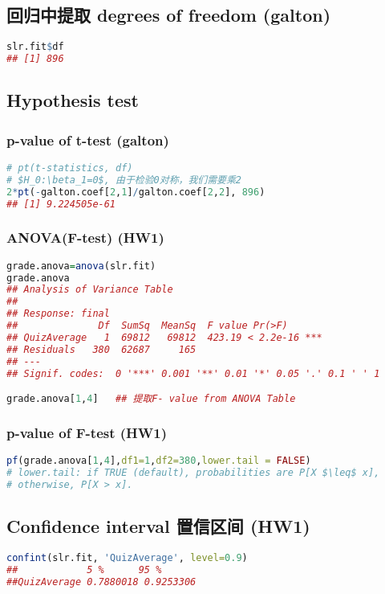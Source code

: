 \documentclass[11pt,a4paper]{article}
\begin{document}
\subsection{回归中提取 degrees of freedom (galton)}
\begin{lstlisting}[language=R]
slr.fit$df
## [1] 896
\end{lstlisting}












\subsection{Hypothesis test}
\subsubsection{p-value of t-test (galton)}
\begin{lstlisting}[language=R]
# pt(t-statistics, df)
# $H_0:\beta_1=0$, 由于检验0对称，我们需要乘2
2*pt(-galton.coef[2,1]/galton.coef[2,2], 896)
## [1] 9.224505e-61
\end{lstlisting}


\subsubsection{ANOVA(F-test) (HW1)}
\begin{lstlisting}[language=R]
grade.anova=anova(slr.fit)
grade.anova
## Analysis of Variance Table
##
## Response: final
##              Df  SumSq  MeanSq  F value Pr(>F)
## QuizAverage   1  69812   69812  423.19 < 2.2e-16 ***
## Residuals   380  62687     165
## ---
## Signif. codes:  0 '***' 0.001 '**' 0.01 '*' 0.05 '.' 0.1 ' ' 1

grade.anova[1,4]   ## 提取F- value from ANOVA Table
\end{lstlisting}

\subsubsection{p-value of F-test (HW1)}
\begin{lstlisting}[language=R]
pf(grade.anova[1,4],df1=1,df2=380,lower.tail = FALSE)
# lower.tail: if TRUE (default), probabilities are P[X $\leq$ x],
# otherwise, P[X > x].
\end{lstlisting}


\subsection{Confidence interval 置信区间 (HW1)}
\begin{lstlisting}[language=R]
confint(slr.fit, 'QuizAverage', level=0.9)
##            5 %      95 %
##QuizAverage 0.7880018 0.9253306
\end{lstlisting}
\end{document}
